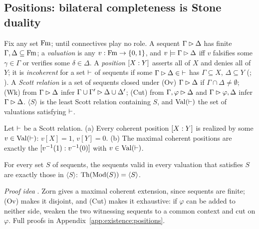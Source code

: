 \subsection{Positions: bilateral completeness is Stone duality}\label{sec:existence:positions}

Fix any set $\mathrm{Fm}$; until  connectives play no role. A sequent $\Gamma\rhd\Delta$ has finite $\Gamma,\Delta\subseteq\mathrm{Fm}$; a \emph{valuation} is any $v:\mathrm{Fm}\to\{0,1\}$, and $v\models\Gamma\rhd\Delta$ iff $v$ falsifies some $\gamma\in\Gamma$ or verifies some $\delta\in\Delta$. A \emph{position} $[X : Y]$ asserts all of $X$ and denies all of $Y$; it is \emph{incoherent} for a set ${\vdash}$ of sequents if some $\Gamma\rhd\Delta\in{\vdash}$ has $\Gamma\subseteq X$, $\Delta\subseteq Y$ (\citealt{restall2005multiple}; ). A \emph{Scott relation} is a set of sequents closed under (Ov) $\Gamma\rhd\Delta$ if $\Gamma\cap\Delta\neq\emptyset$; (Wk) from $\Gamma\rhd\Delta$ infer $\Gamma\cup\Gamma'\rhd\Delta\cup\Delta'$; (Cut) from $\Gamma,\varphi\rhd\Delta$ and $\Gamma\rhd\varphi,\Delta$ infer $\Gamma\rhd\Delta$. $\langle S\rangle$ is the least Scott relation containing $S$, and $\mathrm{Val}(\vdash)$ the set of valuations satisfying ${\vdash}$.

\begin{theorem}\label{thm:existence:bilindenbaum}
Let ${\vdash}$ be a Scott relation. \textup{(a)} Every coherent position $[X : Y]$ is realized by some $v\in\mathrm{Val}(\vdash)$: $v[X]=1$, $v[Y]=0$. \textup{(b)} The maximal coherent positions are exactly the $[v^{-1}(1) : v^{-1}(0)]$ with $v\in\mathrm{Val}(\vdash)$.
\hfill{}\ 
\end{theorem}

\begin{corollary}\label{cor:existence:bilateral}
For every set $S$ of sequents, the sequents valid in every valuation that satisfies $S$ are exactly those in $\langle S\rangle$: $\mathrm{Th}(\mathrm{Mod}(S))=\langle S\rangle$.
\hfill{}
\end{corollary}

\emph{Proof idea} \citep{scott1974completeness,shoesmith1978multiple}. Zorn gives a maximal coherent extension, since sequents are finite; (Ov) makes it disjoint, and (Cut) makes it exhaustive: if $\varphi$ can be added to neither side, weaken the two witnessing sequents to a common context and cut on $\varphi$. Full proofs in Appendix~\ref{app:existence:positions}.

